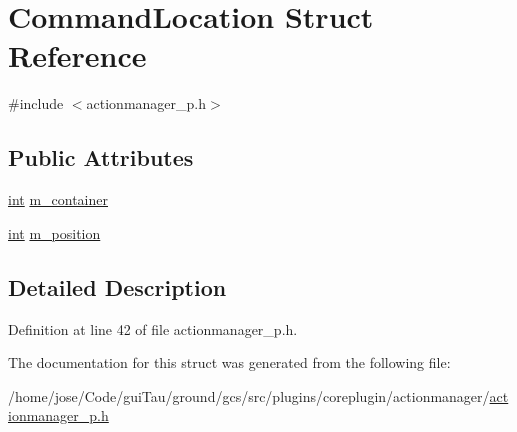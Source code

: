 \hypertarget{struct_command_location}{\section{Command\-Location Struct Reference}
\label{struct_command_location}
}


{\ttfamily \#include $<$actionmanager\-\_\-p.\-h$>$}

\subsection*{Public Attributes}
\begin{DoxyCompactItemize}
\item 
\hyperlink{ioapi_8h_a787fa3cf048117ba7123753c1e74fcd6}{int} \hyperlink{group___core_plugin_ga77fd2ba8f58cd1fb57c0ed468bd2791d}{m\-\_\-container}
\item 
\hyperlink{ioapi_8h_a787fa3cf048117ba7123753c1e74fcd6}{int} \hyperlink{group___core_plugin_gac64dc48172acb67e87bb6a0ae5f4aeb5}{m\-\_\-position}
\end{DoxyCompactItemize}


\subsection{Detailed Description}


Definition at line 42 of file actionmanager\-\_\-p.\-h.



The documentation for this struct was generated from the following file\-:\begin{DoxyCompactItemize}
\item 
/home/jose/\-Code/gui\-Tau/ground/gcs/src/plugins/coreplugin/actionmanager/\hyperlink{actionmanager__p_8h}{actionmanager\-\_\-p.\-h}\end{DoxyCompactItemize}
